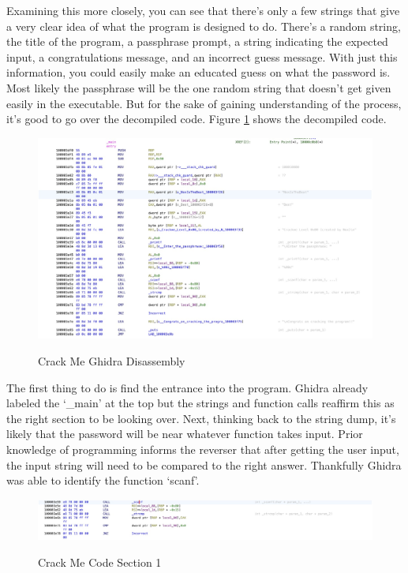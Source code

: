 Examining this more closely, you can see that there’s only a few strings that give a very clear idea of what the program is designed to do. 
There’s a random string, the title of the program, a passphrase prompt, a string indicating the expected input, a congratulations message, and an incorrect guess message. 
With just this information, you could easily make an educated guess on what the password is. 
Most likely the passphrase will be the one random string that doesn’t get given easily in the executable. 
But for the sake of gaining understanding of the process, it’s good to go over the decompiled code. 
Figure \ref{fig:crackmeghidra} shows the decompiled code.
\begin{figure}[H]
	\caption{Crack Me Ghidra Disassembly}
	\includegraphics[scale=.25]{crackmeghidra.png}
        \label{fig:crackmeghidra}
\end{figure}

The first thing to do is find the entrance into the program. 
Ghidra already labeled the ‘\_main’ at the top but the strings and function calls reaffirm this as the right section to be looking over. 
Next, thinking back to the string dump, it’s likely that the password will be near whatever function takes input. 
Prior knowledge of programming informs the reverser that after getting the user input, the input string will need to be compared to the right answer. 
Thankfully Ghidra was able to identify the function ‘scanf’.

\begin{figure}[H]
	\caption{Crack Me Code Section 1}
	\includegraphics[scale=.3]{crackmescanf.png}
        \label{fig:crackme1}
\end{figure}

